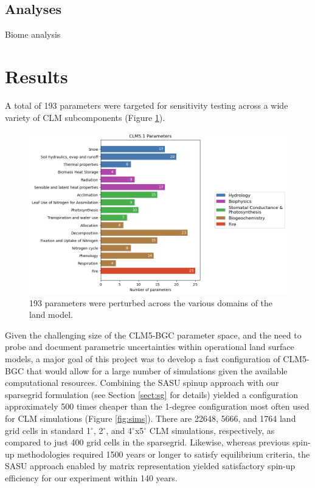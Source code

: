 \documentclass[draft]{agujournal2019}
\begin{document}
\subsection{Analyses}

Biome analysis

\section{Results}

A total of 193 parameters were targeted for sensitivity testing across a wide variety of CLM subcomponents (Figure \ref{fig:params}).

\begin{figure}[h]
\centering
\includegraphics[width=\textwidth]{../figs/main/bar.png}
\caption{193 parameters were perturbed across the various domains of the land model.}
\label{fig:params}
\end{figure}

Given the challenging size of the CLM5-BGC parameter space, and the need to probe and document parametric uncertainties within operational land surface models, a major goal of this project was to develop a fast configuration of CLM5-BGC that would allow for a large number of simulations given the available computational resources.
Combining the SASU spinup approach with our sparsegrid formulation (see Section \ref{sect:sg} for details) yielded a configuration approximately 500 times cheaper than the 1-degree configuration most often used for CLM simulations (Figure \ref{fig:sims}).
There are 22648, 5666, and 1764 land grid cells in standard 1$^{\circ}$, 2$^{\circ}$, and 4$^{\circ}$x5$^{\circ}$ CLM simulations, respectively, as compared to just 400 grid cells in the sparsegrid.
Likewise, whereas previous spin-up methodologies required 1500 years or longer to satisfy equilibrium criteria, the SASU approach enabled by matrix representation yielded satisfactory spin-up efficiency for our experiment within 140 years.
\end{document}
